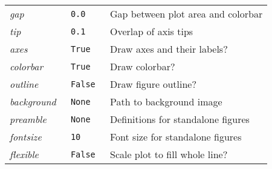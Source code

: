 \documentclass[10pt]{article}
\newlength\spacing
\begin{document}
\begin{tabular}{>{\it} l >{\tt} l l}
    gap & 0.0 & Gap between plot area and colorbar \\
    tip & 0.1 & Overlap of axis tips \\
    [\spacing]
    axes & True & Draw axes and their labels? \\
    colorbar & True & Draw colorbar? \\
    outline & False & Draw figure outline? \\
    [\spacing]
    background & None & Path to background image \\
    [\spacing]
    preamble & None & Definitions for standalone figures \\
    fontsize & 10 & Font size for standalone figures \\
    [\spacing]
    flexible & False & Scale plot to fill whole line? \\
  \end{tabular}
\end{document}
